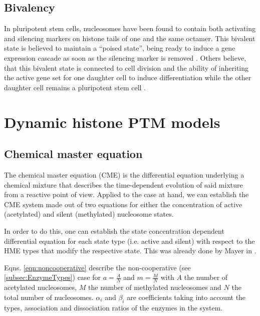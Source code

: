         \subsection{Bivalency}
            \label{sec:TheoryBivalency}
            In pluripotent stem cells, nucleosomes have been found to contain both activating and silencing markers on histone tails of one and the same octamer. This bivalent state is believed to maintain a “poised state”, being ready to induce a gene expression cascade as soon as the silencing marker is removed \cite{lesch2014poised,bernhart2016changes}. %
            Others believe, that this bivalent state is connected to cell division and the ability of inheriting the active gene set for one daughter cell to induce differentiation while the other daughter cell remains a pluripotent stem cell \cite{schuettengruber2017genome}. %
    \section{Dynamic histone PTM models}
        \subsection{Chemical master equation}
        \label{subsec:CME}
            The chemical master equation (CME) is the differential equation underlying a chemical mixture that describes the time-dependent evolution of said mixture from a reactive point of view. Applied to the case at hand, we can establish the CME system made out of two equations for either the concentration of active (acetylated) and silent (methylated) nucleosome states.

            In order to do this, one can establish the state concentration dependent differential equation \cite{lemons1908paper} for each state type (i.e. active and silent) with respect to the HME types that modify the respective state. This was already done by Mayer in \cite{mayer2020langevin}.

            Eqns. \ref{eqn:noncooperative} describe the non-cooperative (see \ref{subsec:EnzymeTypes}) case for $a = \frac{A}{N}$ and $m = \frac{M}{N}$ with $A$ the number of acetylated nucleosomes, $M$ the number of methylated nucleosomes and $N$ the total number of nucleosomes. $\alpha_i$ and $\beta_i$ are coefficients taking into account the types, association and dissociation ratios of the enzymes in the system. %

